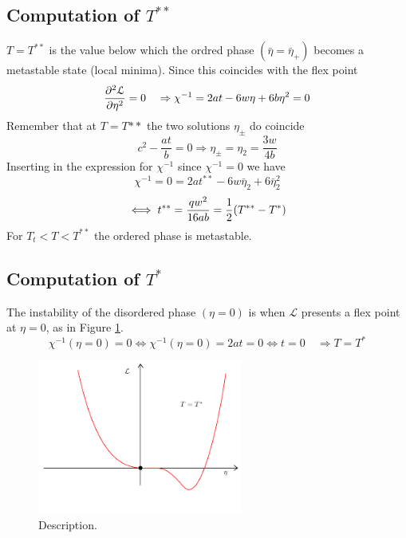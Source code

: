 \documentclass[../main/main.tex]{subfiles}
\begin{document}
\subsection{Computation of \( T^{**} \) }
\( T=T^{**} \) is the value below which the ordred phase \( (\bar{\eta } = \bar{\eta }_+ ) \) becomes a metastable state (local minima). Since this coincides with the flex point
\begin{equation}
  \pdv[2]{\mathcal{L}}{\eta } = 0 \quad \Rightarrow \chi ^{-1} = 2 a t - 6 w \eta + 6 b \eta ^2 = 0
\end{equation}
Remember that at \( T=T{**} \)  the two solutions \( \eta _\pm \) do coincide
\begin{equation}
  c^2 - \frac{at}{b} = 0 \Rightarrow \eta _\pm = \eta _2 = \frac{3 w}{4 b}
\end{equation}
Inserting in the expression for \( \chi ^{-1} \) since \( \chi ^{-1} =0 \) we have
\begin{equation}
  \chi ^{-1} = 0 = 2 a t^{**} - 6 w \bar{\eta }_2 + 6 \bar{\eta }_2^2
\end{equation}
\begin{equation}
  \iff t^{**} = \frac{q w^2}{16 a b} = \frac{1}{2} \qty(T^{**}-T^*)
\end{equation}
For \( T_t < T < T^{**} \) the ordered phase is metastable.

\subsection{Computation of \( T^* \)}
The instability of the disordered phase \( (\eta =0) \) is when \( \mathcal{L} \) presents a flex point at \( \eta =0 \), as in Figure \ref{fig:16_6}.
\begin{equation}
  \chi ^{-1} (\eta =0) = 0 \iff \chi ^{-1} (\eta =0) = 2 a t = 0 \iff t = 0 \quad \Rightarrow T = T^*
\end{equation}

\begin{figure}[h!]
\centering
\includegraphics[width=0.6\textwidth]{../lessons/16_image/6.pdf}
\caption{\label{fig:16_6} Description.}
\end{figure}
\end{document}
